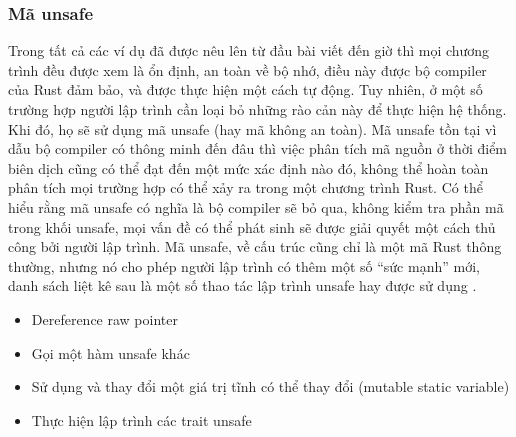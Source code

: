 \subsubsection{Mã unsafe}\label{lbl:unsafe_code}
Trong tất cả các ví dụ đã được nêu lên từ đầu bài viết đến giờ thì mọi chương trình đều được xem là ổn định, an toàn về bộ nhớ, điều này được bộ compiler của Rust đảm bảo, và được thực hiện một cách tự động.
Tuy nhiên, ở một số trường hợp người lập trình cần loại bỏ những rào cản này để thực hiện hệ thống.
Khi đó, họ sẽ sử dụng mã unsafe (hay mã không an toàn).
Mã unsafe tồn tại vì dẫu bộ compiler có thông minh đến đâu thì việc phân tích mã nguồn ở thời điểm biên dịch cũng có thể đạt đến một mức xác định nào đó, không thể hoàn toàn phân tích mọi trường hợp có thể xảy ra trong một chương trình Rust.
Có thể hiểu rằng mã unsafe có nghĩa là bộ compiler sẽ bỏ qua, không kiểm tra phần mã trong khối unsafe, mọi vấn đề có thể phát sinh sẽ được giải quyết một cách thủ công bởi người lập trình.
Mã unsafe, về cấu trúc cũng chỉ là một mã Rust thông thường, nhưng nó cho phép người lập trình có thêm một số ``sức mạnh'' mới, danh sách liệt kê sau là một số thao tác lập trình unsafe hay được sử dụng \cite{rustygecko}.
\begin{itemize}
\item Dereference raw pointer
\item Gọi một hàm unsafe khác
\item Sử dụng và thay đổi một giá trị tĩnh có thể thay đổi (mutable static variable)
\item Thực hiện lập trình các trait unsafe
\end{itemize}

